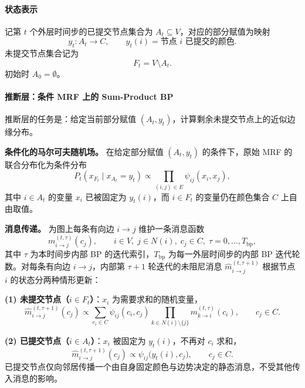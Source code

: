 \paragraph{状态表示}
记第 $t$ 个外层时间步的已提交节点集合为 $A_t \subseteq V$，对应的部分赋值为映射
\begin{equation}
  y_t \colon A_t \to C, \qquad y_t(i)=\text{节点 $i$ 已提交的颜色}.
\end{equation}
未提交节点集合记为
\begin{equation}
  F_t = V \setminus A_t.
\end{equation}
初始时 $A_0=\emptyset$。

\paragraph{推断层：条件 MRF 上的 Sum-Product BP}
推断层的任务是：给定当前部分赋值 $(A_t, y_t)$，计算剩余未提交节点上的近似边缘分布。

\textbf{条件化的马尔可夫随机场。}
在给定部分赋值 $(A_t, y_t)$ 的条件下，原始 MRF 的联合分布化为条件分布
\begin{equation}
  P_t(x_{F_t}\mid x_{A_t}=y_t)
  \propto
  \prod_{(i,j)\in E} \psi_{ij}(x_i, x_j),
\end{equation}
其中 $i\in A_t$ 的变量 $x_i$ 已被固定为 $y_t(i)$，而 $i\in F_t$ 的变量仍在颜色集合 $C$ 上自由取值。

\textbf{消息传递。}
为图上每条有向边 $i\to j$ 维护一条消息函数
\begin{equation}
  m_{i\to j}^{(t,\tau)}(c_j),\qquad
  i\in V,\; j\in N(i),\; c_j\in C,\; \tau=0,\ldots,T_{\mathrm{bp}},
\end{equation}
其中 $\tau$ 为本时间步内部 BP 的迭代索引，$T_{\mathrm{bp}}$ 为每一外层时间步的内部 BP 迭代轮数。对每条有向边 $i\to j$，内部第 $\tau+1$ 轮迭代的未阻尼消息 $\hat{m}_{i\to j}^{(t,\tau+1)}$ 根据节点 $i$ 的状态分两种情形更新：

\textbf{(1) 未提交节点（$i\in F_t$）}：$x_i$ 为需要求和的随机变量，
\begin{equation}
  \hat{m}_{i\to j}^{(t,\tau+1)}(c_j)
  \propto
  \sum_{c_i\in C}
  \psi_{ij}(c_i,c_j)
  \prod_{k\in N(i)\setminus\{j\}}
  m_{k\to i}^{(t,\tau)}(c_i),
  \qquad c_j\in C.
\end{equation}

\textbf{(2) 已提交节点（$i\in A_t$）}：$x_i$ 被固定为 $y_t(i)$，不再对 $c_i$ 求和，
\begin{equation}
  \hat{m}_{i\to j}^{(t,\tau+1)}(c_j)
  \propto
  \psi_{ij}\bigl(y_t(i),c_j\bigr),
  \qquad c_j\in C.
\end{equation}
已提交节点仅向邻居传播一个由自身固定颜色与边势决定的静态消息，不受其他传入消息的影响。

